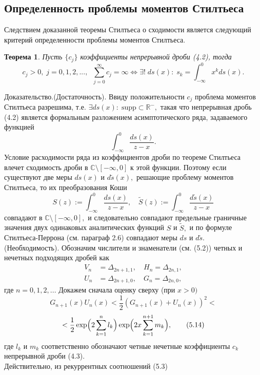 \documentclass[12pt,a4paper]{article}
\theoremstyle{plain}   \newtheorem{Pro}{Задача}
\newtheorem{The}{Теорема}
\begin{document}
\subsection{Определенность проблемы моментов Стилтьеса}
Следствием доказанной теоремы Стилтьеса о сходимости
является следующий критерий определенности
проблемы моментов Стилтьеса.
\begin{The}
Пусть
$ \{ c_j \} $
коэффициенты непрерывной дроби (4.2), тогда
$$
  c_j >0, \; j=0,1,2,..., \; \;
    \sum _{j=0}^{\infty}c_j =\infty
	  \Longleftrightarrow
	    \exists ! \; ds(x) : \;
		  s_k = \int _{-\infty}^0 x^k ds(x) .
$$
\end{The}
{\Large Доказательство.(Достаточность).}
Ввиду положительности
$ c_j $
проблема моментов Стилтьеса разрешима, т.е.
$ \exists ds(x): \; \mathrm{supp} \subset \mathbb{R}^- , $
такая что непрерывная дробь (4.2) является формальным
разложением асимптотического ряда, задаваемого функцией
$$
  \int _{-\infty}^0 \frac{ds(x)}{z-x} .
$$
Условие расходимости ряда из коэффициентов дроби
по теореме Стилтьеса влечет сходимость дроби в
$ \mathbb{C} \setminus [-\infty ,0] $
к этой функции. Поэтому если существуют две меры
$ ds(x) $ и $ d \tilde s(x) , $
решающие проблему моментов Стилтьеса, то их
преобразования Коши
$$
  S(z):=\int _{-\infty}^0 \frac{ds(x)}{z-x}, \quad
    \tilde S(z):=\int _{-\infty}^0 \frac
	{d\tilde s(x)}{z-x}
$$
совпадают в
$ \mathbb{C} \setminus [-\infty , 0] , $
и следовательно совпадают предельные граничные значения
двух одинаковых аналитических функций
$ S $ и $ \tilde S , $
и по формуле Стилтьеса-Перрона (см. параграф 2.6)
совпадают меры
$ ds $ и $ d\tilde s .$ \\
{\Large (Необходимость).}
Обозначим числители и знаменатели (см. (5.2)) четных и
нечетных подходящих дробей как
\begin{align*}
  V_n & = \Delta _{2n+1,1}, \quad
    H_n  = \Delta _{2n,1} , \\
  U_n & = \Delta _{2n+1,0} , \quad
    G_n  = \Delta _{2n,0} ,
\end{align*}
где
$ n=0,1,2,... $
Докажем сначала оценку сверху (при
$ x>0) $
$$
  G_{n+1}(x)U_n (x) < \frac{1}{2}
    (G_{n+1}(x)+U_n (x))^2 <
$$
$$
	 <\frac{1}{2}
	  \exp \Bigl (2 \sum _{k=1}^n l_k \Bigr )
	  \exp \Bigl (2x \sum _{k=1}^{n+1} m_k \Bigr ) ,
	    \qquad (5.14)
$$
где
$ l_k $ и $ m_k $
соответственно обозначают четные  нечетные коэффициенты
$ c_k $
непрерывной дроби (4.3).\\
Действительно, из рекуррентных соотношений (5.3)
\end{document}
